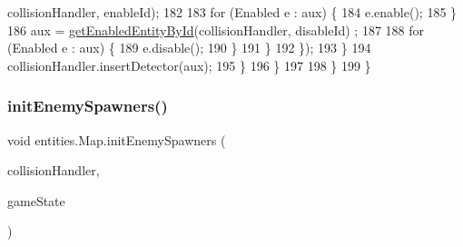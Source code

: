 \begin{DoxyCode}
      collisionHandler, enableId);
182 
183                                 \textcolor{keywordflow}{for} (Enabled e : aux) \{
184                                     e.enable();
185                                 \}
186                                 aux = \mbox{\hyperlink{classentities_1_1_map_afc132389c586910ffe04d24a96ae5d19}{getEnabledEntityById}}(collisionHandler, disableId)
      ;
187 
188                                 \textcolor{keywordflow}{for} (Enabled e : aux) \{
189                                     e.disable();
190                                 \}
191                             \}
192                         \});
193                     \}
194                     collisionHandler.insertDetector(aux);
195                 \}
196             \}
197 
198         \}
199     \}
\end{DoxyCode}
\mbox{\label{classentities_1_1_map_a475dade0cc451ced58633690801baec5}} 
\subsubsection{\texorpdfstring{init\+Enemy\+Spawners()}{initEnemySpawners()}}
{\footnotesize\ttfamily void entities.\+Map.\+init\+Enemy\+Spawners (\begin{DoxyParamCaption}\item[{\mbox{\hyperlink{classentities_1_1_collision_handler}{Collision\+Handler}}}]{collision\+Handler,  }\item[{\mbox{\hyperlink{classstates_1_1_game_state}{Game\+State}}}]{game\+State }\end{DoxyParamCaption})\hspace{0.3cm}{\ttfamily [inline]}}


